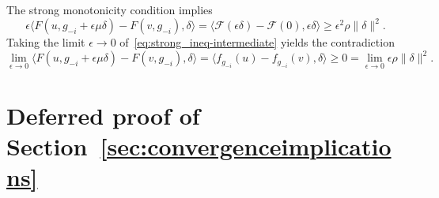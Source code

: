 \documentclass[twoside,11pt]{article}
\newcommand{\F}{\mathcal{F}}
\begin{document}
The strong monotonicity condition implies
\begin{equation}\label{eq:strong_ineq-intermediate}
    \epsilon \langle F(u, g_{-i} + \epsilon\mu\delta) - F(v, g_{-i}), \delta \rangle = \langle \F(\epsilon \delta) - \F(0), \epsilon \delta \rangle \geq \epsilon^2 \rho \|\delta\|^2.
\end{equation}
Taking the limit $\epsilon \to 0$ of~\eqref{eq:strong_ineq-intermediate} yields the contradiction
\[
    \lim_{\epsilon \to 0} \langle F(u, g_{-i} + \epsilon\mu\delta) - F(v, g_{-i}), \delta \rangle = \langle f_{g_{-i}}(u) - f_{g_{-i}}(v), \delta \rangle \geq 0 = \lim_{\epsilon \to 0} \epsilon \rho \|\delta\|^2.
    \tag*{\BlackBox}
\]

\section{Deferred proof of Section~\ref{sec:convergenceimplications}}\label{app:deferred-section-3-1}
\end{document}
